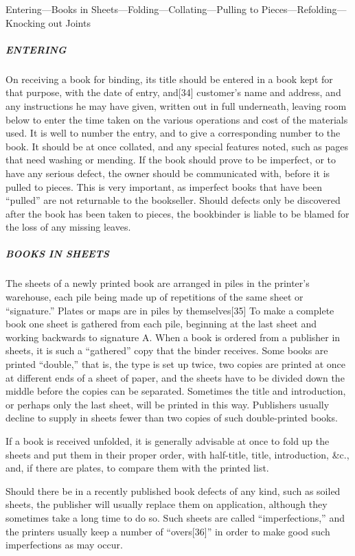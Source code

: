 \documentclass[
]{article}
\begin{document}
Entering---Books in Sheets---Folding---Collating---Pulling to
Pieces---Refolding---Knocking out Joints

\hypertarget{entering}{%
\subparagraph{ENTERING}\label{entering}}

{On} receiving a book for binding, its title should be entered in a book
kept for that purpose, with the date of entry,
and{\protect\hypertarget{Page_34}{}{{[}34{]}}} customer's name and
address, and any instructions he may have given, written out in full
underneath, leaving room below to enter the time taken on the various
operations and cost of the materials used. It is well to number the
entry, and to give a corresponding number to the book. It should be at
once collated, and any special features noted, such as pages that need
washing or mending. If the book should prove to be imperfect, or to have
any serious defect, the owner should be communicated with, before it is
pulled to pieces. This is very important, as imperfect books that have
been ``pulled'' are not returnable to the bookseller. Should defects
only be discovered after the book has been taken to pieces, the
bookbinder is liable to be blamed for the loss of any missing leaves.

\hypertarget{books-in-sheets}{%
\subparagraph{BOOKS IN SHEETS}\label{books-in-sheets}}

The sheets of a newly printed book are arranged in piles in the
printer's warehouse, each pile being made up of repetitions of the same
sheet or ``signature.'' Plates or maps are in piles by
themselves{\protect\hypertarget{Page_35}{}{{[}35{]}}} To make a complete
book one sheet is gathered from each pile, beginning at the last sheet
and working backwards to signature A. When a book is ordered from a
publisher in sheets, it is such a ``gathered'' copy that the binder
receives. Some books are printed ``double,'' that is, the type is set up
twice, two copies are printed at once at different ends of a sheet of
paper, and the sheets have to be divided down the middle before the
copies can be separated. Sometimes the title and introduction, or
perhaps only the last sheet, will be printed in this way. Publishers
usually decline to supply in sheets fewer than two copies of such
double-printed books.

If a book is received unfolded, it is generally advisable at once to
fold up the sheets and put them in their proper order, with half-title,
title, introduction, \&c., and, if there are plates, to compare them
with the printed list.

Should there be in a recently published book defects of any kind, such
as soiled sheets, the publisher will usually replace them on
application, although they sometimes take a long time to do so. Such
sheets are called ``imperfections,'' and the printers usually keep a
number of ``overs{\protect\hypertarget{Page_36}{}{{[}36{]}}}'' in order
to make good such imperfections as may occur.
\end{document}
